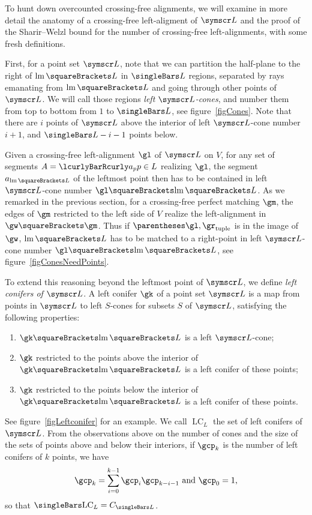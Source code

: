 \documentclass[10pt, a4paper, twoside]{basestyle}
\DeclareMathOperator{\leftmost}{lm}
\DeclareMathOperator{\LC}{LC}
\newcommand{\pointset}{\symscr}
\begin{document}
To hunt down overcounted crossing-free alignments, we will examine in more detail the anatomy of a crossing-free
left-aligment of $\pointset L$ and the proof of the Sharir--Welzl bound for the number of crossing-free left-alignments,
with some fresh definitions.

First, for a point set $\pointset L$, note that we can partition the half-plane to the right of $\leftmost\of L$ in
$\Cardinality L$ regions,
separated by rays emanating from $\leftmost\of L$ and going through other points of $\pointset L$. We will call those regions
\emph{left $\pointset L$-cones}, and number them from top to bottom from $1$ to $\Cardinality L$, see figure~\ref{figCones}.
Note that there are $i$ points of $\pointset L$ above the interior of left $\pointset L$-cone
number $i+1$, and $\Cardinality L - i - 1$ points below.

Given a crossing-free left-alignment $\gl$ of $\pointset L$ on $V$, for any set of segments $A=\setst{a_p}{p\in L}$
realizing $\gl$, the segment $a_{\leftmost\of L}$ of the leftmost point then has to be contained in left
$\pointset L$-cone number $\gl\of{\leftmost\of L}$.
As we remarked in the previous section, for a crossing-free perfect matching $\gm$, the edges of $\gm$ restricted
to the left side of $V$ realize the left-alignment in $\gw\of\gm$. Thus if $\tuple{\gl, \gr}$ is in the image of
$\gw$, $\leftmost\of L$ has to be matched to a right-point in left $\pointset L$-cone number $\gl\of{\leftmost\of L}$, see
figure~\ref{figConesNeedPoints}.

To extend this reasoning beyond the leftmost point of $\pointset L$, we define \emph{left conifers of $\pointset L$}.
A left conifer $\gk$ of a point set $\pointset L$ is a map from points in $\pointset L$ to left $S$-cones for subsets $S$
of $\pointset L$,
satisfying the following properties:
\begin{enumerate}
\item $\gk\of{\leftmost\of L}$ is a left $\pointset L$-cone;
\item $\gk$ restricted to the points above the interior of $\gk\of{\leftmost\of L}$ is a left conifer of these points;
\item $\gk$ restricted to the points below the interior of $\gk\of{\leftmost\of L}$ is a left conifer of these points.
\end{enumerate}
See figure~\ref{figLeftconifer} for an example.
We call $\LC_L$ the set of left conifers of $\pointset L$. From the observations above on the number of cones and the
size of the sets of points above and below their interiors, if $\gcp_k$ is the number of left conifers of $k$ points,
we have
\[
\gcp_k=\sum{i=0}[k-1]\gcp_{i}\gcp_{k-i-1} \text{ and } \gcp_0=1\text,
\]
so that $\Cardinality{\LC_L} = C_{\Cardinality L}$.
\end{document}
